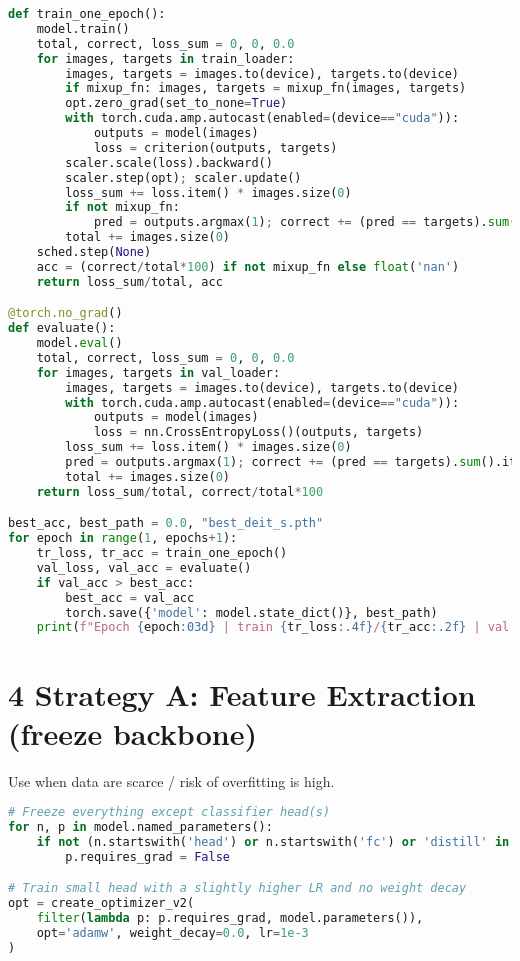\documentclass[11pt]{article}
\begin{document}
\begin{lstlisting}[language=python,style=code]
def train_one_epoch():
    model.train()
    total, correct, loss_sum = 0, 0, 0.0
    for images, targets in train_loader:
        images, targets = images.to(device), targets.to(device)
        if mixup_fn: images, targets = mixup_fn(images, targets)
        opt.zero_grad(set_to_none=True)
        with torch.cuda.amp.autocast(enabled=(device=="cuda")):
            outputs = model(images)
            loss = criterion(outputs, targets)
        scaler.scale(loss).backward()
        scaler.step(opt); scaler.update()
        loss_sum += loss.item() * images.size(0)
        if not mixup_fn:
            pred = outputs.argmax(1); correct += (pred == targets).sum().item()
        total += images.size(0)
    sched.step(None)
    acc = (correct/total*100) if not mixup_fn else float('nan')
    return loss_sum/total, acc

@torch.no_grad()
def evaluate():
    model.eval()
    total, correct, loss_sum = 0, 0, 0.0
    for images, targets in val_loader:
        images, targets = images.to(device), targets.to(device)
        with torch.cuda.amp.autocast(enabled=(device=="cuda")):
            outputs = model(images)
            loss = nn.CrossEntropyLoss()(outputs, targets)
        loss_sum += loss.item() * images.size(0)
        pred = outputs.argmax(1); correct += (pred == targets).sum().item()
        total += images.size(0)
    return loss_sum/total, correct/total*100

best_acc, best_path = 0.0, "best_deit_s.pth"
for epoch in range(1, epochs+1):
    tr_loss, tr_acc = train_one_epoch()
    val_loss, val_acc = evaluate()
    if val_acc > best_acc:
        best_acc = val_acc
        torch.save({'model': model.state_dict()}, best_path)
    print(f"Epoch {epoch:03d} | train {tr_loss:.4f}/{tr_acc:.2f} | val {val_loss:.4f}/{val_acc:.2f}")
\end{lstlisting}

\section*{4 Strategy A: Feature Extraction (freeze backbone)}
Use when data are scarce / risk of overfitting is high.
\begin{lstlisting}[language=python,style=code]
# Freeze everything except classifier head(s)
for n, p in model.named_parameters():
    if not (n.startswith('head') or n.startswith('fc') or 'distill' in n):
        p.requires_grad = False

# Train small head with a slightly higher LR and no weight decay
opt = create_optimizer_v2(
    filter(lambda p: p.requires_grad, model.parameters()),
    opt='adamw', weight_decay=0.0, lr=1e-3
)
\end{lstlisting}
\end{document}
